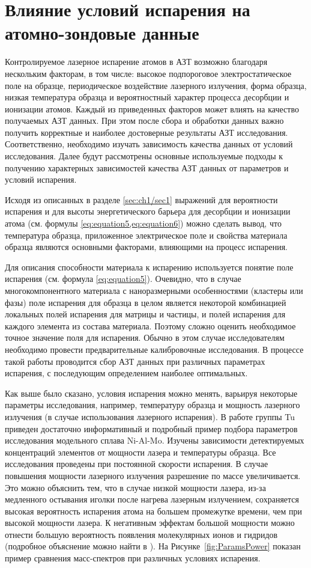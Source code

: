 \section{Влияние условий испарения на атомно-зондовые данные}\label{sec:ch1/sec5} 

Контролируемое лазерное испарение атомов в АЗТ возможно благодаря нескольким факторам, в том числе: высокое подпороговое электростатическое поле на образце, периодическое воздействие лазерного излучения, форма образца, низкая температура образца и вероятностный характер процесса десорбции и ионизации атомов. Каждый из приведенных факторов может влиять на качество получаемых АЗТ данных. При этом после сбора и обработки данных важно получить корректные и наиболее достоверные результаты АЗТ исследования. Соответственно, необходимо изучать зависимость качества данных от условий исследования. Далее будут рассмотрены основные используемые подходы к получению характерных зависимостей качества АЗТ данных от параметров и условий испарения.

Исходя из описанных в разделе \cref{sec:ch1/sec1} выражений для вероятности испарения и для высоты энергетического барьера для десорбции и ионизации атома (см. формулы  \cref{eq:equation5,eq:equation6}) можно сделать вывод, что температура образца, приложенное электрическое поле и свойства материала образца являются основными факторами, влияющими на процесс испарения.

Для описания способности материала к испарению используется понятие поле испарения \cite{Vurpillot16} (см. формула \cref{eq:equation5}). Очевидно, что в случае многокомпонентного материала с наноразмерными особенностями (кластеры или фазы) поле испарения для образца в целом является некоторой комбинацией локальных полей испарения для матрицы и частицы, и полей испарения для каждого элемента из состава материала. Поэтому сложно оценить необходимое точное значение поля для испарения. Обычно в этом случае исследователям необходимо провести предварительные калибровочные исследования. В процессе такой работы проводится сбор АЗТ данных при различных параметрах испарения, с последующим определением наиболее оптимальных. 

Как выше было сказано, условия испарения можно менять, варьируя некоторые параметры исследования, например, температуру образца и мощность лазерного излучения (в случае использования лазерного испарения). В работе группы Tu \cite{Tu15} приведен достаточно информативный и подробный пример подбора параметров исследования модельного сплава Ni-Al-Mo. Изучены зависимости детектируемых концентраций элементов от мощности лазера и температуры образца. Все исследования проведены при постоянной скорости испарения. В случае повышения мощности лазерного излучения разрешение по массе увеличивается. Это можно объяснить тем, что в случае низкой мощности лазера, из-за медленного остывания иголки после нагрева лазерным излучением, сохраняется высокая вероятность испарения атома на большем промежутке времени, чем при высокой мощности лазера. К негативным эффектам большой мощности можно отнести большую вероятность появления молекулярных ионов и гидридов (подробное объяснение можно найти в \cite{GaultBOOK}). На Рисунке~\cref{fig:ParamsPower} показан пример сравнения масс-спектров при различных условиях испарения.


